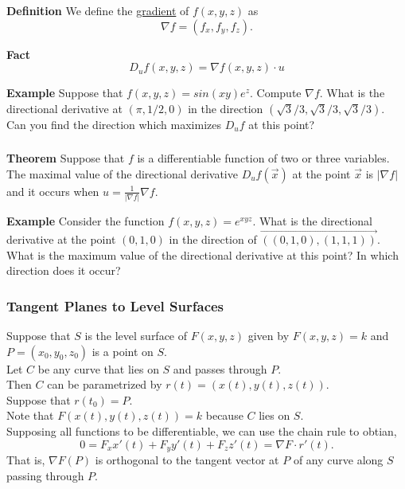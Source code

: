 \begin{frame}[fragile]\frametitle{}
\textbf{Definition}
 We define the \underline{gradient} of $f(x,y,z)$ as
 $$
 \nabla f = (f_x,f_y,f_z).
 $$
 

\textbf{Fact}
 $$
 D_u f(x,y,z) = \nabla f(x,y,z) \cdot u
 $$
  

\textbf{Example}
 Suppose that $f(x,y,z) = sin(xy)e^z$.  Compute $\nabla f$.  What is the directional derivative at $(\pi,1/2,0)$ in the direction $(\sqrt{3}/3, \sqrt{3}/3, \sqrt{3}/3)$.  Can you find the direction which maximizes $D_u f$ at this point?

\end{frame}


\begin{frame}[fragile]\frametitle{}
\textbf{Theorem}
 Suppose that $f$ is a differentiable function of two or three variables.  The maximal value of the directional derivative $D_u f(\vec{x})$ at the point $\vec{x}$ is $|\nabla f|$ and it occurs when $u= \frac{1}{|\nabla f|} \nabla f$.
  

\textbf{Example}
 Consider the function $f(x,y,z) = e^{xyz}$.  What is the directional derivative at the point $(0,1,0)$ in the direction of 
 $\overrightarrow{((0,1,0),(1,1,1))}$.  What is the maximum value of the directional derivative at this point?  In which direction does it occur?

\end{frame}



\begin{frame}[fragile]\frametitle{Tangent Planes to Level Surfaces}
Suppose that $S$ is the level surface of $F(x,y,z)$ given by $F(x,y,z)=k$ and $P=(x_0,y_0,z_0)$ is a point on $S$.  \\ 
Let $C$ be any curve that lies on $S$ and passes through $P$.  \\ 
Then $C$ can be parametrized by $r(t)=(x(t),y(t),z(t))$.  \\ 
Suppose that $r(t_0)=P$.  \\ 
Note that $F(x(t),y(t),z(t))= k$ because $C$ lies on $S$.  \\ 
Supposing all functions to be differentiable, we can use the chain rule to obtian,
$$
0 = F_x x'(t) + F_y y'(t) + F_z z'(t) =  \nabla F \cdot r'(t).
$$ 
That is, $\nabla F(P)$ is orthogonal to the tangent vector at $P$ of any curve along $S$ passing through $P$. 
\end{frame}



